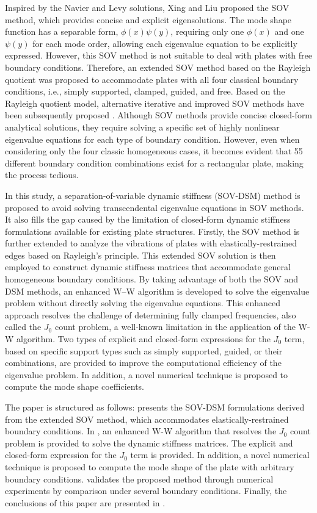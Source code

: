 \documentclass[preprint,12pt,number]{elsarticle}
\begin{document}
Inspired by the Navier and Levy solutions, Xing and Liu \cite{xing2009new} proposed the SOV method, which provides concise and explicit eigensolutions.
The mode shape function has a separable form, $\phi(x) \psi(y)$, requiring only one $\phi(x)$ and one $\psi(y)$ for each mode order, allowing each eigenvalue equation to be explicitly expressed.
However, this SOV method is not suitable to deal with plates with free boundary conditions.
Therefore, an extended SOV method \cite{xing2018overall, xing2020extended} based on the Rayleigh quotient was proposed to accommodate plates with all four classical boundary conditions, i.e., simply supported, clamped, guided, and free.
Based on the Rayleigh quotient model, alternative iterative and improved SOV methods have been subsequently proposed \cite{xing2020improved}.
Although SOV methods provide concise closed-form analytical solutions, they require solving a specific set of highly nonlinear eigenvalue equations for each type of boundary condition.
However, even when considering only the four classic homogeneous cases, it becomes evident that 55 different boundary condition combinations exist for a rectangular plate, making the process tedious.

In this study, a separation-of-variable dynamic stiffness (SOV-DSM) method is proposed to avoid solving transcendental eigenvalue equations in SOV methods.
It also fills the gap caused by the limitation of closed-form dynamic stiffness formulations available for existing plate structures.
Firstly, the SOV method is further extended to analyze the vibrations of plates with elastically-restrained edges based on Rayleigh’s principle. 
This extended SOV solution is then employed to construct dynamic stiffness matrices that accommodate general homogeneous boundary conditions.
By taking advantage of both the SOV and DSM methods, an enhanced W–W algorithm is developed to solve the eigenvalue problem without directly solving the eigenvalue equations.
This enhanced approach resolves the challenge of determining fully clamped frequencies, also called the $J_0$ count problem, a well-known limitation in the application of the W-W algorithm. 
Two types of explicit and closed-form expressions for the $J_0$ term, based on specific support types such as simply supported, guided, or their combinations, are provided to improve the computational efficiency of the eigenvalue problem.
In addition, a novel numerical technique is proposed to compute the mode shape coefficients. 

The paper is structured as follows:  presents the SOV-DSM formulations derived from the extended SOV method, which accommodates elastically-restrained boundary conditions.
In , an enhanced W-W algorithm that resolves the $J_0$ count problem is provided to solve the dynamic stiffness matrices. 
The explicit and closed-form expression for the $J_0$ term is provided. 
In addition, a novel numerical technique is proposed to compute the mode shape of the plate with arbitrary boundary conditions.
 validates the proposed method through numerical experiments by comparison under several boundary conditions.
Finally, the conclusions of this paper are presented in .
\end{document}
